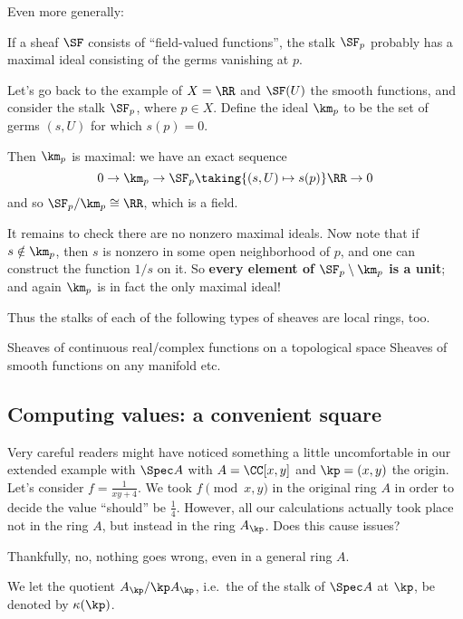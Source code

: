Even more generally:
\begin{moral}
	If a sheaf $\SF$ consists of ``field-valued functions'',
	the stalk $\SF_p$ probably has a maximal ideal
	consisting of the germs vanishing at $p$.
\end{moral}

\begin{example}
Let's go back to the example of $X = \RR$ and $\SF(U)$ the smooth functions,
and consider the stalk $\SF_{p}$, where $p \in X$.
Define the ideal $\km_p$ to be the set of germs $(s,U)$ for which $s(p) = 0$.

Then $\km_p$ is maximal: we have an exact sequence
\[ 0 \to \km_p \to \SF_p \taking{(s,U) \mapsto s(p)} \RR \to 0 \]
and so $\SF_p / \km_p \cong \RR$, which is a field.

It remains to check there are no nonzero maximal ideals.
Now note that if $s \notin \km_p$,
then $s$ is nonzero in some open neighborhood of $p$,
and one can construct the function $1/s$ on it.
So \textbf{every element of $\SF_p \setminus \km_p$ is a unit};
and again $\km_p$ is in fact the only maximal ideal!

Thus the stalks of each of the following types of sheaves
are local rings, too.
\begin{itemize}
	\ii Sheaves of continuous real/complex functions on a topological space
	\ii Sheaves of smooth functions on any manifold
	\ii etc.
\end{itemize}
\end{example}

\subsection{Computing values: a convenient square}
\label{sec:convenient_square}
Very careful readers might have noticed something
a little uncomfortable in our extended example with $\Spec A$
with $A = \CC[x,y]$ and $\kp = (x,y)$ the origin.
Let's consider $f = \frac{1}{xy+4}$.
We took $f \pmod{x,y}$ in the original ring $A$ in order
to decide the value ``should'' be $\frac14$.
However, all our calculations actually
took place not in the ring $A$, but instead in the ring $A_\kp$.
Does this cause issues?

Thankfully, no, nothing goes wrong, even in a general ring $A$.

\begin{definition}
	We let the quotient $A_\kp / \kp A_\kp$,
	i.e.\ the  of the stalk of $\Spec A$ at $\kp$,
	be denoted by $\kappa(\kp)$.
\end{definition}


